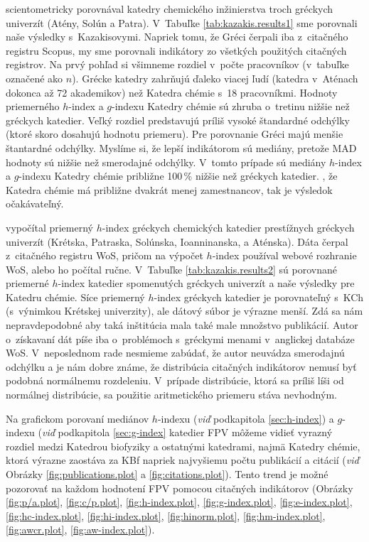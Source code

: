 \citet{Kazakis2015} scientometricky porovnával katedry chemického inžinierstva
troch gréckych univerzít (Atény, Solún a Patra).  V~Tabuľke
\ref{tab:kazakis.results1} sme porovnali naše výsledky s~Kazakisovymi. Napriek
tomu, že Gréci čerpali iba z~citačného registru Scopus, my sme porovnali
indikátory zo všetkých použitých citačných registrov. Na prvý pohľad si všimneme
rozdiel v~počte pracovníkov (v~tabuľke označené ako $n$).  Grécke katedry
zahrňujú ďaleko viacej ľudí (katedra v~Aténach dokonca až 72 akademikov) než
Katedra chémie s~18 pracovníkmi.  Hodnoty priemerného $h$-index a $g$-indexu
Katedry chémie sú zhruba o~tretinu nižšie než gréckych katedier.  Veľký rozdiel
predstavujú príliš vysoké štandardné odchýlky (ktoré skoro dosahujú hodnotu
priemeru). Pre porovnanie Gréci majú menšie štantardné odchýlky.  Myslíme si, že
lepší indikátorom sú mediány, pretože MAD hodnoty sú nižšie než smerodajné
odchýlky.  V~tomto prípade sú mediány $h$-index a $g$-indexu Katedry chémie
približne 100\,\% nižšie než gréckych katedier. , že Katedra chémie má približne
dvakrát menej zamestnancov, tak je výsledok očakávateľný.

\citet{Lazaridis2010} vypočítal priemerný $h$-index gréckych chemických katedier
prestížnych gréckych univerzít (Krétska, Patraska, Solúnska, Ioanninanska, a
Aténska).  Dáta čerpal z~citačného registru WoS, pričom na výpočet $h$-index
používal webové rozhranie WoS, alebo ho počítal ručne.  V~Tabuľke
\ref{tab:kazakis.results2} sú porovnané priemerné $h$-index katedier spomenutých
gréckych univerzít a naše výsledky pre Katedru chémie. Síce priemerný $h$-index
gréckych katedier je porovnateľný s~KCh (s~výnimkou Krétskej univerzity), ale
dátový súbor je výrazne menší. Zdá sa nám nepravdepodobné aby taká inštitúcia
mala také male množstvo publikácií.  Autor o~získavaní dát píše iba o~problémoch
s~gréckymi menami v~anglickej databáze WoS. V~neposlednom rade nesmieme zabúdať,
že autor neuvádza smerodajnú odchýlku a je nám dobre známe, že distribúcia
citačných indikátorov nemusí byť podobná normálnemu rozdeleniu. V~prípade
distribúcie, ktorá sa príliš líši od normálnej distribúcie, sa použitie
aritmetického priemeru stáva nevhodným.

Na grafickom porovaní mediánov $h$-indexu (\emph{viď} podkapitola
\ref{sec:h-index}) a $g$-indexu (\emph{viď} podkapitola \ref{sec:g-index}
katedier FPV môžeme vidieť vyrazný rozdiel medzi Katedrou biofyziky a ostatnými
katedrami, najmä Katedry chémie, ktorá výrazne zaostáva za KBf napriek
najvyšiemu počtu publikácií a citácií (\emph{viď} Obrázky
\ref{fig:publications.plot} a \ref{fig:citations.plot}).  Tento trend je možné
pozorovať na každom hodnotení FPV pomocou citačných indikátorov (Obrázky
\ref{fig:p/a.plot}, \ref{fig:c/p.plot}, \ref{fig:h-index.plot},
\ref{fig:g-index.plot}, \ref{fig:e-index.plot}, \ref{fig:hc-index.plot},
\ref{fig:hi-index.plot}, \ref{fig:hinorm.plot}, \ref{fig:hm-index.plot},
\ref{fig:awcr.plot}, \ref{fig:aw-index.plot}).

